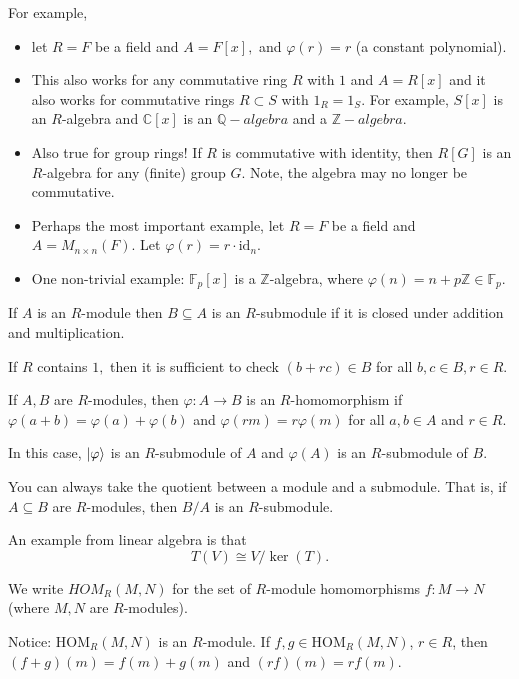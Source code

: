 \documentclass{article}
\numberwithin{equation}{section}
\begin{document}
For example,
\begin{itemize}
    \item let $R=F$ be a field and $A = F[x],$ and $\varphi(r)=r$ (a constant polynomial).

    \item This also works for any commutative ring $R$ with $1$ and $A=R[x]$ and it also works for commutative rings $R\subset S$ with $1_R=1_S.$ For example, $S[x]$ is an $R$-algebra and $\mathbb{C}[x]$ is an $\mathbb{Q}-algebra$ and a $\mathbb{Z}-algebra.$
    
    \item Also true for group rings! If $R$ is commutative with identity, then $R[G]$ is an $R$-algebra for any (finite) group $G.$ Note, the algebra may no longer be commutative.
    
    \item Perhaps the most important example, let $R=F$ be a field and $A=M_{n\times n}(F).$ Let $\varphi(r) = r \cdot \text{id}_n.$
    \item One non-trivial example: $\mathbb{F}_p[x]$ is a $\mathbb{Z}$-algebra, where $\varphi(n)=n+p\mathbb{Z} \in \mathbb{F}_p.$
\end{itemize}
\begin{definition}
    If $A$ is an $R$-module then $B\subseteq A$ is an $R$-submodule if it is closed under addition and multiplication.
\end{definition}
\begin{proposition}
    If $R$ contains $1,$ then it is sufficient to check $(b+rc)\in B$ for all $b,c\in B,r\in R.$
\end{proposition}
\begin{definition}
    If $A,B$ are $R$-modules, then $\varphi:A\to B$ is an $R$-homomorphism if $\varphi(a+b)=\varphi(a)+\varphi(b)$ and $\varphi(rm)=r\varphi(m)$ for all $a,b\in A$ and $r\in R.$
\end{definition}
In this case, $\ket\varphi$ is an $R$-submodule of $A$ and $\varphi(A)$ is an $R$-submodule of $B.$

You can always take the quotient between a module and a submodule. That is, if $A\subseteq B$ are $R$-modules, then $B/A$ is an $R$-submodule.

An example from linear algebra is that 
\begin{equation}
    T(V) \cong V/\ker(T).
\end{equation}
\begin{definition}
    We write $HOM_R(M,N)$ for the set of $R$-module homomorphisms $f:M\to N$ (where $M,N$ are $R$-modules).
\end{definition}
Notice: $\text{HOM}_R(M,N)$ is an $R$-module. If $f,g\in \text{HOM}_R(M,N)$, $r\in R$, then $(f+g)(m)=f(m)+g(m)$ and $(rf)(m)=rf(m).$
\end{document}
